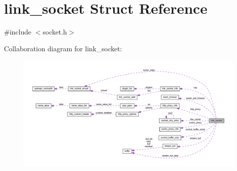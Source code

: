 \hypertarget{structlink__socket}{}\section{link\+\_\+socket Struct Reference}
\label{structlink__socket}


{\ttfamily \#include $<$socket.\+h$>$}



Collaboration diagram for link\+\_\+socket\+:
\nopagebreak
\begin{figure}[H]
\begin{center}
\leavevmode
\includegraphics[width=350pt]{structlink__socket__coll__graph}
\end{center}
\end{figure}
